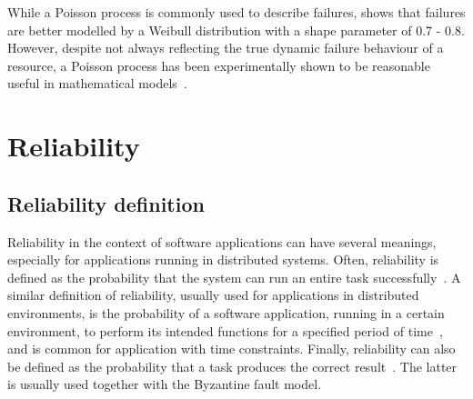 \documentclass{cslthse-msc}
\begin{document}
While a Poisson process is commonly used to describe failures, \cite{studyOfFailures} shows that failures are better modelled by a Weibull distribution with a shape parameter of 0.7 - 0.8. However, despite not always reflecting the true dynamic failure behaviour of a resource, a Poisson process has been experimentally shown to be reasonable useful in mathematical models~\cite{experimentalFailureAssessment}.

\section{Reliability} \label{sec:background_reliability}
\subsection{Reliability definition} \label{subsec:background_reliability_definition}
Reliability in the context of software applications can have several meanings, especially for applications running in distributed systems. Often, reliability is defined as the probability that the system can run an entire task successfully~\cite{taskAllocation, relModelDistSimSystem, studyServiceRel, hierarchicalRelModeling, generalAlgoRelEval, realTimeRelAnalysis, selfAdaptRel, perfRelNonMarkovian}. A similar definition of reliability, usually used for applications in distributed environments, is the probability of a software application, running in a certain environment, to perform its intended functions for a specified period of time~\cite{surveyReliabilityDistr, surveyRelPrediction, relDistApplications}, and is common for application with time constraints. Finally, reliability can also be defined as the probability that a task produces the correct result~\cite{surveyRelPrediction, relAndPerfGridServices, relGridServicePredConstraint, relModelWebServices, selfAdaptRel}. The latter is usually used together with the Byzantine fault model. 

\end{document}
